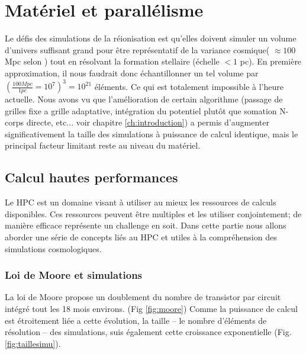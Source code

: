 
\chapter{Matériel et parallélisme}
\label{sec:materiel}

Le défis des simulations de la réionisation est qu'elles doivent simuler un volume d'univers suffisant grand pour être représentatif de la variance cosmique( $\approx 100$ Mpc selon \cite{iliev_cosmological_2006}) tout en résolvant la formation stellaire (échelle $<1$ pc).
En première approximation, il nous faudrait donc échantillonner un tel volume par $\left( \frac{100Mpc}{1pc} = 10^7 \right) ^3 = 10^{21}$ éléments.
Ce qui est totalement impossible à l'heure actuelle.
Nous avons vu que l'amélioration de certain algorithme (passage de grilles fixe a grille adaptative, intégration du potentiel plutôt que somation N-corps directe, etc... voir chapitre \ref{ch:introduction}) a permis d'augmenter significativement la taille des simulations à puissance de calcul identique, mais le principal facteur limitant reste au niveau du matériel.

\section{Calcul hautes performances}

Le \ac{HPC} est un domaine visant à utiliser au mieux les ressources de calculs disponibles.
Ces ressources peuvent être multiples et les utiliser conjointement; de manière efficace représente un challenge en soit.
Dans cette partie nous allons aborder une série de concepts liés au \ac{HPC} et utiles à la compréhension des simulations cosmologiques.


\subsection{Loi de Moore et simulations}
La loi de Moore \citep{moore1965cramming} propose un doublement du nombre de transistor par circuit intégré tout les 18 mois environs. (Fig \ref{fig:moore})
Comme la puissance de calcul est étroitement liée a cette évolution, la taille -- le nombre d'éléments de résolution -- des simulations, suis également cette croissance exponentielle (Fig. \ref{fig:taillesimu}).

